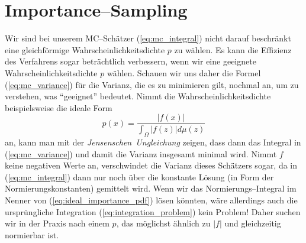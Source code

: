 	\section{Importance--Sampling}\label{subsec:importancesampling}
	Wir sind bei unserem MC--Schätzer (\ref{eq:mc_integral}) nicht darauf beschränkt eine gleich\-för\-mi\-ge Wahrscheinlichkeitsdichte $p$ zu wählen. Es kann die Effizienz des Verfahrens sogar beträchtlich verbessern, wenn wir eine geeignete Wahrscheinlichkeitsdichte $p$ wählen. Schauen wir uns daher die Formel (\ref{eq:mc_variance}) für die Varianz, die es zu minimieren gilt, nochmal an, um zu verstehen, was ``geeignet'' bedeutet. Nimmt die Wahrscheinlichkeitsdichte beispielsweise die ideale Form
	\begin{equation}
		p(x)=\frac{|f(x)|}{\int_\Omega |f(z)|d\mu(z)}
		\label{eq:ideal_importance_pdf}
	\end{equation}
	an, kann man mit der {\em Jensenschen~Ungleichung} zeigen, dass dann das Integral in (\ref{eq:mc_variance}) und damit die Varianz insgesamt minimal wird. Nimmt $f$ keine negativen Werte an, verschwindet die Varianz dieses Schätzers sogar, da in (\ref{eq:mc_integral}) dann nur noch über die konstante Lösung (in Form der Normierungskonstanten) gemittelt wird. Wenn wir das Normierungs--Integral im Nenner von (\ref{eq:ideal_importance_pdf}) lösen könnten, wäre allerdings auch die ursprüngliche Integration (\ref{eq:integration_problem}) kein Problem! Daher suchen wir in der Praxis nach einem $p$, das möglichst ähnlich zu $|f|$ und gleichzeitig normierbar ist.
	
